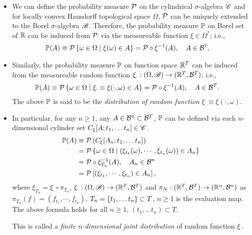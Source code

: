 \documentclass[11pt]{article}
\begin{document}
\begin{itemize}
\item We can define the probability measure ${\mathcal P}$ on the cylindrical $\sigma$-algebra ${\mathscr C}$ and for locally convex Hausdorff topological space $\Omega$, ${\mathcal P}$ can be uniquely extended to the Borel $\sigma$-algebra ${\mathscr B}$. Therefore, the probability measure ${\mathbb P}$ on Borel set of ${\mathbb R}$ can be induced from ${\mathcal P}$ via the measureable function $\xi\in \Omega^{*}$; i.e.,  
\begin{align}
  {\mathbb P}(A) &\equiv {\mathcal P}\left\{ \omega\in \Omega\; |\; \xi(\omega) \in A  \right\} = {\mathcal P}\circ\xi^{-1}(A), \quad A\in {\mathcal B}^{1}, \label{eqn: measurable_xi}
\end{align}

\item Similarly, the probability measure ${\mathbb P}$ on function space ${\mathbb R}^{T}$ can be induced from the measureable random function $\xi_{\cdot}: (\Omega, {\mathscr B}) \rightarrow ({\mathbb R}^{T},  {\mathcal B}^{T})$; i.e., 
\begin{align*}
 {\mathbb P}(A) &\equiv {\mathcal P}\left\{ \omega\in \Omega\; |\; \xi_{\cdot}\equiv \xi(\cdot,\omega) \in A  \right\} = {\mathcal P}\circ\xi_{\cdot}^{-1}(A), \quad A\in {\mathcal B}^{T}.
\end{align*} The above ${\mathbb P}$ is said to be the \emph{distribution of random function} $\xi_{\cdot}\equiv \xi(\cdot,\omega)$.  

\item In particular, for any $n\ge 1$, any $A\in {\mathcal B}^{n} \subset {\mathcal B}^{T}$, ${\mathbb P}$ can be defined via each $n$-dimensional cylinder set $C_{\xi}[A; t_{1},\ldots t_{n}] \in {\mathscr C}$. 
\begin{align}
 {\mathbb P}(A) &\equiv  {\mathcal P}\left(C_{\xi}[A_{n}; t_{1},\ldots t_{n}]\right) \nonumber \\
 &= {\mathcal P}\left\{ \omega\in \Omega\; |\;  (\xi_{t_{1}}(\omega), \cdots, \xi_{t_{n}}(\omega) )  \in A_{n}  \right\} \nonumber\\
 &= {\mathcal P}\circ \xi_{T_{n}}^{-1}(A), \quad A_{n}\in {\mathcal B}^{n} \label{eqn: measureable_finite_dim_fun}\\
 &= {\mathcal P}\left[(\xi_{t_{1}}, \cdots, \xi_{t_{n}} )  \in A_{n}\right], \nonumber
\end{align} where $\xi_{T_{n}}= \xi_{\cdot}\circ \pi_{T_{n}}$, $\xi_{\cdot}: (\Omega, {\mathscr B}) \rightarrow ({\mathbb R}^{T},  {\mathcal B}^{T})$ and $\pi_{N}: ({\mathbb R}^{T}, {\mathcal B}^{T} )\rightarrow ({\mathbb R}^{n},{\mathcal B}^{n})$ as $\pi_{T_{n}}(f)= (f_{t_{1}}, \cdots, f_{t_{n}})$, $T_{n}= \left\{t_{1},\ldots t_{n}\right\} \subset T$, $n\ge 1$ is the evaluation map. The above formula holds for all $n\ge 1$, $(t_{1},\ldots t_{n})\subset T$.

This is called a \emph{finite $n$-dimensional joint distribution} of random function $\xi_{\cdot}$. 



\end{itemize}
\end{document}
